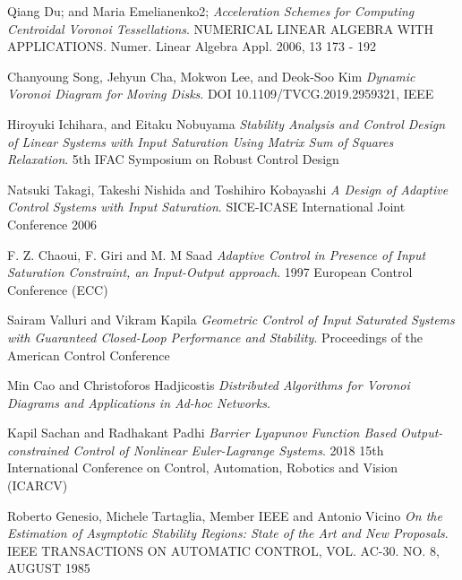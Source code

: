 \begin{thebibliography}{9}
Qiang Du; and Maria Emelianenko2;
\textit{Acceleration Schemes for Computing Centroidal Voronoi Tessellations}. 
NUMERICAL LINEAR ALGEBRA WITH APPLICATIONS. Numer. Linear Algebra Appl. 2006, 13 173 - 192

Chanyoung Song, Jehyun Cha, Mokwon Lee, and Deok-Soo Kim
\textit{Dynamic Voronoi Diagram for Moving Disks}. 
DOI 10.1109/TVCG.2019.2959321, IEEE

Hiroyuki Ichihara, and Eitaku Nobuyama
\textit{Stability Analysis and Control Design of Linear Systems with Input Saturation Using Matrix Sum of Squares Relaxation}. 
5th IFAC Symposium on Robust Control Design

Natsuki Takagi, Takeshi Nishida and Toshihiro Kobayashi
\textit{A Design of Adaptive Control Systems with Input Saturation}. 
SICE-ICASE International Joint Conference 2006

F. Z. Chaoui, F. Giri and M. M Saad
\textit{Adaptive Control in Presence of Input Saturation Constraint, an Input-Output approach}. 
1997 European Control Conference (ECC)

Sairam Valluri and Vikram Kapila
\textit{Geometric Control of Input Saturated Systems with Guaranteed Closed-Loop Performance and Stability}. 
Proceedings of the American Control Conference

Min Cao and Christoforos Hadjicostis
\textit{Distributed Algorithms for Voronoi Diagrams and Applications in Ad-hoc Networks}. 

Kapil Sachan and Radhakant Padhi
\textit{Barrier Lyapunov Function Based Output-constrained Control of Nonlinear Euler-Lagrange Systems}. 
2018 15th International Conference on Control, Automation, Robotics and Vision (ICARCV)

Roberto Genesio, Michele Tartaglia, Member IEEE and Antonio Vicino
\textit{On the Estimation of Asymptotic Stability Regions: State of the Art and New Proposals}. 
IEEE TRANSACTIONS ON AUTOMATIC CONTROL, VOL. AC-30. NO. 8, AUGUST 1985











\end{thebibliography}
 
